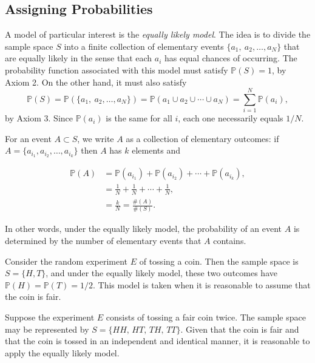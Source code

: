\documentclass[]{book}
\numberwithin{equation}{chapter}
\numberwithin{figure}{chapter}
\theoremstyle{plain}
\theoremstyle{definition}
\theoremstyle{remark}
\theoremstyle{definition}
\theoremstyle{definition}
\theoremstyle{remark}
\let\BeginKnitrBlock\begin \let\EndKnitrBlock\end
\begin{document}
\subsection{Assigning Probabilities}\label{assigning-probabilities}

A model of particular interest is the \emph{equally likely model}. The
idea is to divide the sample space \(S\) into a finite collection of
elementary events \(\{ a_{1},\ a_{2}, \ldots, a_{N} \}\) that are
equally likely in the sense that each \(a_{i}\) has equal chances of
occurring. The probability function associated with this model must
satisfy \(\mathbb{P}(S)=1\), by Axiom 2. On the other hand, it must also
satisfy \[ \mathbb{P}(S)=\mathbb{P}( \{ a_{1},\
a_{2},\ldots,a_{N} \} )=\mathbb{P}(a_{1}\cup a_{2}\cup\cdots\cup
a_{N})=\sum_{i=1}^{N}\mathbb{P}(a_{i}), \] by Axiom 3. Since
\(\mathbb{P}(a_{i})\) is the same for all \(i\), each one necessarily
equals \(1/N\).

For an event \(A\subset S\), we write \(A\) as a collection of
elementary outcomes: if
\(A = \{ a_{i_{1}}, a_{i_{2}}, \ldots, a_{i_{k}} \}\) then \(A\) has
\(k\) elements and

\begin{align*}
\mathbb{P}(A) & =\mathbb{P}(a_{i_{1}})+\mathbb{P}(a_{i_{2}})+\cdots+\mathbb{P}(a_{i_{k}}),\\
 & =\frac{1}{N}+\frac{1}{N}+\cdots+\frac{1}{N},\\
 & =\frac{k}{N}=\frac{\#(A)}{\#(S)}.
\end{align*}

In other words, under the equally likely model, the probability of an
event \(A\) is determined by the number of elementary events that \(A\)
contains.

\bigskip

\BeginKnitrBlock{example}
\protect\hypertarget{ex:unnamed-chunk-122}{}{\label{ex:unnamed-chunk-122}}Consider
the random experiment \(E\) of tossing a coin. Then the sample space is
\(S=\{H,T\}\), and under the equally likely model, these two outcomes
have \(\mathbb{P}(H)=\mathbb{P}(T)=1/2\). This model is taken when it is
reasonable to assume that the coin is fair.
\EndKnitrBlock{example}

\bigskip

\BeginKnitrBlock{example}
\protect\hypertarget{ex:unnamed-chunk-123}{}{\label{ex:unnamed-chunk-123}}Suppose
the experiment \(E\) consists of tossing a fair coin twice. The sample
space may be represented by \(S=\{HH,\, HT,\, TH,\, TT\}\). Given that
the coin is fair and that the coin is tossed in an independent and
identical manner, it is reasonable to apply the equally likely model.
\EndKnitrBlock{example}
\end{document}
